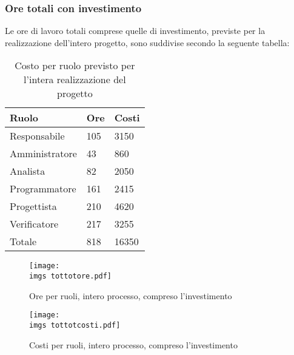 {{	\subsubsection{Ore totali con investimento}{
		Le ore di lavoro totali comprese quelle di investimento, previste per la realizzazione dell’intero progetto, sono suddivise secondo la seguente tabella:
		\begin{table}[H]
			 \centering
			 \begin{tabular}{p{}p{}
			  	  		  				p{}}
				  \toprule Ruolo & Ore  & Costi \\
				  \midrule
				  Responsabile & 105  & 3150 \\
				  Amministratore & 43  & 860 \\
				  Analista & 82  & 2050 \\
				  Programmatore & 161  & 2415 \\
				  Progettista & 210  & 4620 \\
				  Verificatore & 217  & 3255 \\
				  Totale & 818  & 16350 \\
				  \bottomrule
			 \end{tabular}
			 \label{tab:costoinvestimento}
			 \caption{Costo per ruolo previsto per l’intera realizzazione del progetto}
		\end{table}
		
		\begin{figure}[H]
			\centering
			\texttt{[image: \\imgs tottotore.pdf]}
			\label{fig:oreinvestimento}
			\caption{Ore per ruoli, intero processo, compreso l’investimento}
		\end{figure}
		\begin{figure}[H]
			\centering
			\texttt{[image: \\imgs tottotcosti.pdf]}
			\label{fig:costoinvestimento}
			\caption{Costi per ruoli, intero processo, compreso l’investimento}
		\end{figure}
	}
}}
